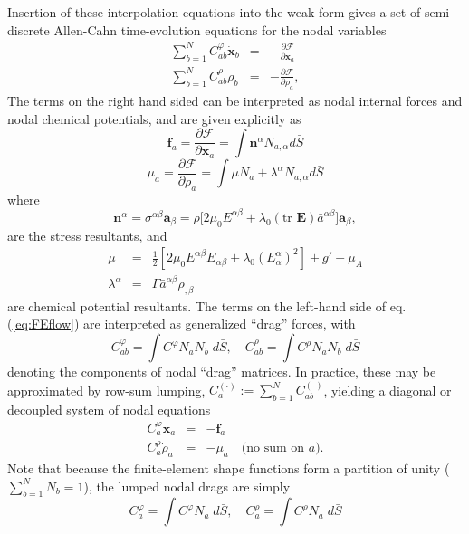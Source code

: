 \documentclass[
pre,
 twocolumn,
amsmath,
amssymb
]{revtex4}
\begin{document}
Insertion of these interpolation equations into the weak form gives a set of semi-discrete Allen-Cahn time-evolution equations for the nodal variables
\begin{subequations}\label{eq:FEflow}
\begin{eqnarray}
\sum_{b=1}^N C^\varphi_{ab}\dot{\bm{x}}_b &=& -  \frac{\partial \mathcal{F}}{\partial \bm{x}_a} \\
\sum_{b=1}^N C^\rho_{ab}\dot{\rho_b} &=& - \frac{\partial \mathcal{F}}{\partial \rho_a} ,
\end{eqnarray}
\end{subequations}
The terms on the right hand sided can be interpreted as nodal internal forces and nodal chemical potentials, and are given explicitly as
\begin{equation*}
\bm{f}_{a} = \frac{\partial \mathcal{F}}{\partial \bm{x}_{a}} = \int \bm{n}^\alpha N_{a,\alpha} d\bar{S} 
\end{equation*}
\begin{equation*}
\mu_{a} = \frac{\partial \mathcal{F}}{\partial \rho_{a}} = \int \mu N_a + \lambda^\alpha N_{a,\alpha} d\bar{S} 
\end{equation*}
where 
\begin{equation}
\bm{n}^\alpha = \sigma^{\alpha\beta}\bm{a}_\beta = \rho\big[2\mu_0 E^{\alpha\beta} + \lambda_0(\text{tr }\mathbf{E})\bar{a}^{\alpha\beta}\big]\bm{a}_\beta,
\end{equation}
are the stress resultants, and 
\begin{eqnarray*}
\mu &=& \frac{1}{2}%
 \left[
    2\mu_0 E^{\alpha\beta}E_{\alpha\beta} + \lambda_0 (E^\alpha_\alpha)^2
 \right] 
+ g' - \mu_A \\
\lambda^\alpha &=& \Gamma \bar{a}^{\alpha\beta}\rho_{,\beta} 
\end{eqnarray*}
are chemical potential resultants.
%
The terms on the left-hand side of eq.(\ref{eq:FEflow}) are interpreted as generalized ``drag'' forces, with 
\[
C^\varphi_{ab} = \int C^\varphi   N_a N_b \; d\bar{S}, \quad
C^\rho_{ab} = \int C^\rho N_a N_b \; d\bar{S} 
\]
denoting the components of nodal ``drag'' matrices.  In practice, these may be approximated by row-sum lumping, $C^{(\cdot)}_{a}:=\sum_{b=1}^N C^{(\cdot)}_{ab}$, yielding a diagonal or decoupled system of nodal equations
\begin{subequations}\label{eq:diagFEflow}
\begin{eqnarray}
C^\varphi_{a}\dot{\bm{x}}_a &=& -  \bm{f}_a \\
C^\rho_{a}\dot{\rho}_a &=& - \mu_a \quad\text{(no sum on $a$)}.
\end{eqnarray}
\end{subequations}
Note that because the finite-element shape functions form a partition of unity ($\sum_{b=1}^N N_b = 1$), the lumped nodal drags are simply
\[
C^\varphi_{a} = \int C^\varphi  N_a \; d\bar{S}, \quad
C^\rho_{a} = \int C^\rho  N_a \; d\bar{S} 
\]
\end{document}
